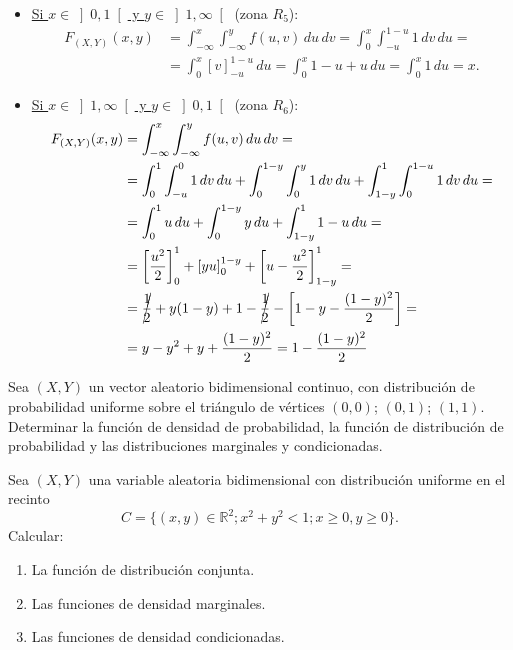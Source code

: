 \begin{ejercicio}
\begin{enumerate}
\begin{itemize}
            \item \ul{Si $x\in \left]0,1\right[$ \quad y \quad $y\in \left]1,\infty\right[$} (zona $R_5$):
            \begin{align*}
                F_{(X,Y)}(x, y) &= \int_{-\infty}^x \int_{-\infty}^y f(u, v) \, du \, dv
                = \int_{0}^{x} \int_{-u}^{1-u} 1 \, dv \, du
                =\\&= \int_{0}^{x} \left[v\right]_{-u}^{1-u} \, du
                = \int_{0}^{x} 1-u+u \, du
                = \int_{0}^{x} 1 \, du = x.
            \end{align*}

            \item \ul{Si $x\in \left]1,\infty\right[$ \quad y \quad $y\in \left]0,1\right[$} (zona $R_6$):
            \begin{align*}
                F_{(X,Y)}(x, y) &= \int_{-\infty}^x \int_{-\infty}^y f(u, v) \, du \, dv
                =\\&= \int_{0}^{1} \int_{-u}^{0} 1 \, dv \, du
                + \int_{0}^{1-y} \int_{0}^{y} 1 \, dv \, du
                + \int_{1-y}^{1} \int_{0}^{1-u} 1 \, dv \, du
                =\\&= \int_{0}^{1} u \, du
                + \int_{0}^{1-y} y \, du
                + \int_{1-y}^{1} 1-u \, du
                =\\&= \left[\dfrac{u^2}{2}\right]_0^1
                + \left[yu\right]_0^{1-y}
                + \left[u-\dfrac{u^2}{2}\right]_{1-y}^1
                =\\&= \cancel{\dfrac{1}{2}}+y(1-y)+1-\cancel{\dfrac{1}{2}}-\left[1-y-\dfrac{(1-y)^2}{2}\right]
                =\\&= y-y^2+y +\dfrac{(1-y)^2}{2}
                = 1-\dfrac{(1-y)^2}{2}
            \end{align*}
        \end{itemize}
    \end{enumerate}
\end{ejercicio}

\begin{ejercicio}
    Sea $(X,Y)$ un vector aleatorio bidimensional continuo, con distribución de probabilidad uniforme sobre el triángulo de vértices $(0,0)$; $(0,1)$; $(1,1)$. Determinar la función de densidad de probabilidad, la función de distribución de probabilidad y las distribuciones marginales y condicionadas.
\end{ejercicio}

\begin{ejercicio}
    Sea $(X,Y)$ una variable aleatoria bidimensional con distribución uniforme en el recinto
    \[
        C = \{(x, y) \in \mathbb{R}^2; x^2 + y^2 < 1; x \geq 0, y \geq 0\}.
    \]
    Calcular:
    \begin{enumerate}
        \item La función de distribución conjunta.
        \item Las funciones de densidad marginales.
        \item Las funciones de densidad condicionadas.
    \end{enumerate}
\end{ejercicio}